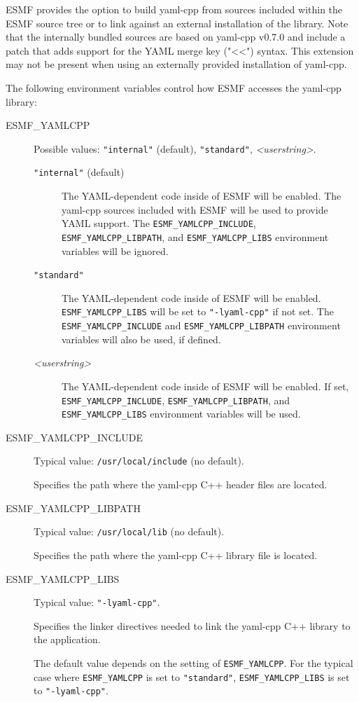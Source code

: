ESMF provides the option to build yaml-cpp from sources included within the
ESMF source tree or to link against an external installation of the library.
Note that the internally bundled sources are based on yaml-cpp v0.7.0 and
include a patch that adds support for the YAML merge key ("<<") syntax. This
extension may not be present when using an externally provided installation of
yaml-cpp.

The following environment variables control how ESMF accesses the yaml-cpp
library:

\begin{description}

\item[ESMF\_YAMLCPP] Possible values: {\tt "internal"} (default),
{\tt "standard"}, {\it <userstring>}.

\begin{description}
\item[{\tt "internal"} (default)] The YAML-dependent code inside of ESMF will
be enabled.
The yaml-cpp sources included with ESMF will be used to provide YAML support.
The {\tt ESMF\_YAMLCPP\_INCLUDE}, {\tt ESMF\_YAMLCPP\_LIBPATH}, and
{\tt ESMF\_YAMLCPP\_LIBS} environment variables will be ignored.

\item[{\tt "standard"}] The YAML-dependent code inside of ESMF will
be enabled.
{\tt ESMF\_YAMLCPP\_LIBS} will be set to {\tt "-lyaml-cpp"} if not set.
The {\tt ESMF\_YAMLCPP\_INCLUDE} and {\tt ESMF\_YAMLCPP\_LIBPATH} environment
variables will also be used, if defined.

\item[{\it <userstring>}] The YAML-dependent code inside of ESMF will
be enabled.
If set, {\tt ESMF\_YAMLCPP\_INCLUDE}, {\tt ESMF\_YAMLCPP\_LIBPATH}, and
{\tt ESMF\_YAMLCPP\_LIBS} environment variables will be used.
\end{description}

\item[ESMF\_YAMLCPP\_INCLUDE] Typical value: {\tt /usr/local/include}
(no default).

Specifies the path where the yaml-cpp C++ header files are located.

\item[ESMF\_YAMLCPP\_LIBPATH] Typical value: {\tt /usr/local/lib} (no default).

Specifies the path where the yaml-cpp C++ library file is located.

\item[ESMF\_YAMLCPP\_LIBS] Typical value: {\tt "-lyaml-cpp"}.

Specifies the linker directives needed to link the yaml-cpp C++ library to
the application.

The default value depends on the setting of {\tt ESMF\_YAMLCPP}.  For the
typical case where {\tt ESMF\_YAMLCPP} is set to {\tt "standard"},
{\tt ESMF\_YAMLCPP\_LIBS} is set to {\tt "-lyaml-cpp"}.
\end{description}


